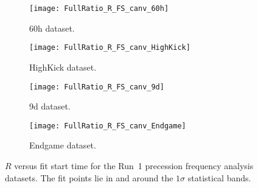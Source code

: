 \begin{figure}[]
\centering
    \begin{subfigure}[]{0.45\textwidth}
        \centering
        \texttt{[image: FullRatio\_R\_FS\_canv\_60h]}
        \caption{60h dataset.}
    \end{subfigure}%
    \begin{subfigure}[]{0.45\textwidth}
        \centering
        \texttt{[image: FullRatio\_R\_FS\_canv\_HighKick]}
        \caption{HighKick dataset.}
    \end{subfigure}

    \begin{subfigure}[]{0.45\textwidth}
        \centering
        \texttt{[image: FullRatio\_R\_FS\_canv\_9d]}
        \caption{9d dataset.}
    \end{subfigure}%
    \begin{subfigure}[]{0.45\textwidth}
        \centering
        \texttt{[image: FullRatio\_R\_FS\_canv\_Endgame]}
        \caption{Endgame dataset.}
    \end{subfigure}
\caption[$R$ versus fit start time]{$R$ versus fit start time for the Run~1 precession frequency analysis datasets. The fit points lie in and around the $1\sigma$ statistical bands.}
\label{fig:fitStartTime_R}
\end{figure}




